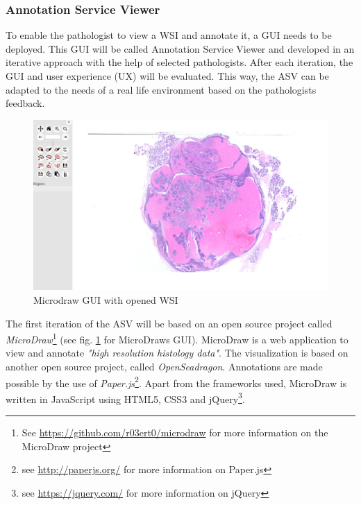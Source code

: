 

\subsubsection{Annotation Service Viewer}
To enable the pathologist to view a WSI and annotate it, a GUI needs to be deployed. This GUI will be called Annotation Service Viewer and developed in an iterative approach with the help of selected pathologists. After each iteration, the GUI and user experience (UX) will be evaluated. This way, the ASV can be adapted to the needs of a real life environment based on the pathologists feedback.

\begin{figure}[H]
	\begin{center}
		\includegraphics[scale=0.2]{img/microdrawUI.png}
		\caption{Microdraw GUI with opened WSI}
		\label{fig4_microdrawUI}
	\end{center}
\end{figure}

The first iteration of the ASV will be based on an open source project called \emph{MicroDraw}\footnote{See \url{https://github.com/r03ert0/microdraw} for more information on the MicroDraw project} (see fig. \ref{fig4_microdrawUI} for MicroDraws GUI).  MicroDraw is a web application to view and annotate \emph{"high resolution histology data"}\cite{web:microdraw2}. The visualization is based on another open source project, called \emph{OpenSeadragon}\cite{web:openseadragon}. Annotations are made possible by the use of \emph{Paper.js}\footnote{see \url{http://paperjs.org/} for more information on Paper.js}. Apart from the frameworks used, MicroDraw is written in JavaScript using HTML5, CSS3 and jQuery\footnote{see \url{https://jquery.com/} for more information on jQuery}.


